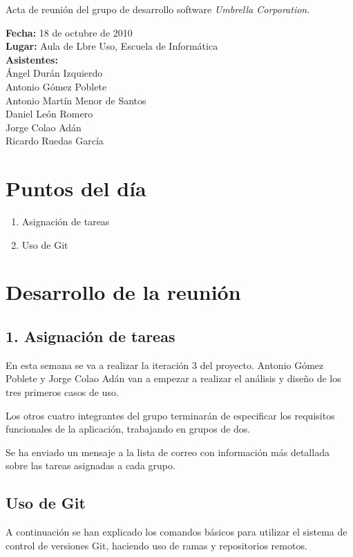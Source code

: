 \documentclass[a4paper,11pt,oneside]{article}
\begin{document}
\pagestyle{fancy}


\begin{center}
{\Large
Acta de reunión del grupo de desarrollo software \textit{Umbrella
Corporation}.}
\end{center}
\textbf{Fecha:} 18 de octubre de 2010\\
\textbf{Lugar:} Aula de Lbre Uso, Escuela de Informática\\
\textbf{Asistentes:}\\
\hspace*{1cm}Ángel Durán Izquierdo\\
\hspace*{1cm}Antonio Gómez Poblete\\
\hspace*{1cm}Antonio Martín Menor de Santos\\
\hspace*{1cm}Daniel León Romero\\
\hspace*{1cm}Jorge Colao Adán\\
\hspace*{1cm}Ricardo Ruedas García


\section*{Puntos del día}

\begin{enumerate}
\item Asignación de tareas
\item Uso de Git
\end{enumerate}


\section*{Desarrollo de la reunión}

\subsection*{1. Asignación de tareas}

En esta semana se va a realizar la iteración 3 del proyecto. Antonio Gómez
Poblete y Jorge Colao Adán van a empezar a realizar el análisis y diseño de los
tres primeros casos de uso.

Los otros cuatro integrantes del grupo terminarán de especificar los requisitos
funcionales de la aplicación, trabajando en grupos de dos.

Se ha enviado un mensaje a la lista de correo con información más detallada
sobre las tareas asignadas a cada grupo.

\subsection*{Uso de Git}

A continuación se han explicado los comandos básicos para utilizar el sistema
de control de versiones Git, haciendo uso de ramas y repositorios remotos.
\end{document}
